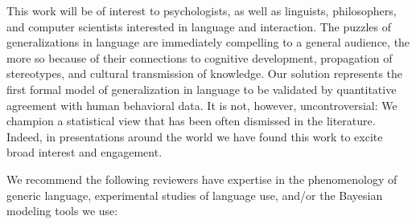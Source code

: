 \documentclass[11pt,letterpaper]{letter} %
\begin{document}
\begin{letter}



This work will be of interest to psychologists, as well as linguists, philosophers, and computer scientists interested in language and interaction.
The puzzles of generalizations in language are immediately compelling to a general audience, the more so because of their connections to cognitive development, propagation of stereotypes, and cultural transmission of knowledge.
Our solution represents the first formal model of generalization in language to be validated by quantitative agreement with human behavioral data.
It is not, however, uncontroversial: We champion a statistical view that has been often dismissed in the literature.
Indeed, in presentations around the world we have found this work to excite broad interest and engagement.

We recommend the following reviewers have expertise in the phenomenology of generic language, experimental studies of language use, and/or the Bayesian modeling tools we use:


\end{letter}
\end{document}

